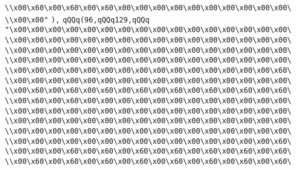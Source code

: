 \verb|\\x00\x60\x00\x60\x00\x60\x00\x00\x00\x00\x00\x00\x00\x00\x00\x00\|\newline
\verb|\\x00\x00"|\newline
\verb|),|\newline
\verb|qQQq(96,qQQq129,qQQq|\newline
\verb|"\x00\x00\x00\x00\x00\x00\x00\x00\x00\x00\x00\x00\x00\x00\x00\x00\|\newline
\verb|\\x00\x00\x00\x00\x00\x00\x00\x00\x00\x00\x00\x00\x00\x00\x00\x00\|\newline
\verb|\\x00\x00\x00\x00\x00\x00\x00\x00\x00\x00\x00\x00\x00\x00\x00\x00\|\newline
\verb|\\x00\x00\x00\x00\x00\x00\x00\x00\x00\x00\x00\x00\x00\x00\x00\x00\|\newline
\verb|\\x00\x00\x00\x00\x00\x00\x00\x00\x00\x00\x00\x00\x00\x00\x00\x60\|\newline
\verb|\\x00\x00\x00\x00\x00\x00\x00\x00\x00\x00\x00\x00\x00\x00\x00\x00\|\newline
\verb|\\x00\x60\x00\x60\x00\x60\x00\x60\x00\x60\x00\x60\x00\x60\x00\x60\|\newline
\verb|\\x00\x60\x00\x60\x00\x00\x00\x00\x00\x00\x00\x00\x00\x00\x00\x00\|\newline
\verb|\\x00\x00\x00\x00\x00\x00\x00\x00\x00\x00\x00\x00\x00\x00\x00\x00\|\newline
\verb|\\x00\x00\x00\x00\x00\x00\x00\x00\x00\x00\x00\x00\x00\x00\x00\x00\|\newline
\verb|\\x00\x00\x00\x00\x00\x00\x00\x00\x00\x00\x00\x00\x00\x00\x00\x00\|\newline
\verb|\\x00\x00\x00\x00\x00\x00\x00\x00\x00\x00\x00\x00\x00\x00\x00\x60\|\newline
\verb|\\x00\x00\x00\x60\x00\x60\x00\x60\x00\x60\x00\x60\x00\x60\x00\x60\|\newline
\verb|\\x00\x60\x00\x60\x00\x60\x00\x60\x00\x60\x00\x60\x00\x60\x00\x60\|\newline
